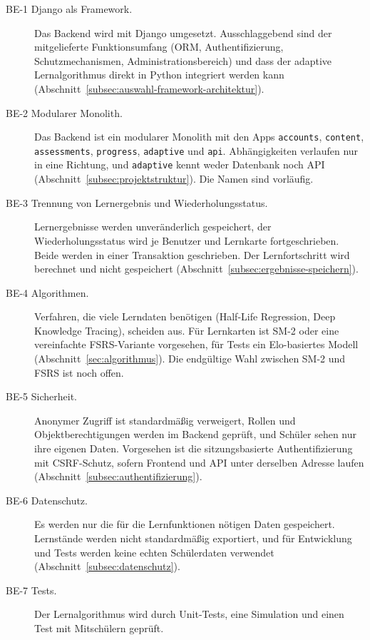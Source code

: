 \begin{description}
  \item[BE-1 Django als Framework.] Das Backend wird mit Django umgesetzt. Ausschlaggebend sind der mitgelieferte Funktionsumfang (ORM, Authentifizierung, Schutzmechanismen, Administrationsbereich) und dass der adaptive Lernalgorithmus direkt in Python integriert werden kann (Abschnitt~\ref{subsec:auswahl-framework-architektur}).
  \item[BE-2 Modularer Monolith.] Das Backend ist ein modularer Monolith mit den Apps \texttt{accounts}, \texttt{content}, \texttt{assessments}, \texttt{progress}, \texttt{adaptive} und \texttt{api}. Abhängigkeiten verlaufen nur in eine Richtung, und \texttt{adaptive} kennt weder Datenbank noch API (Abschnitt~\ref{subsec:projektstruktur}). Die Namen sind vorläufig.
  \item[BE-3 Trennung von Lernergebnis und Wiederholungsstatus.] Lernergebnisse werden unveränderlich gespeichert, der Wiederholungsstatus wird je Benutzer und Lernkarte fortgeschrieben. Beide werden in einer Transaktion geschrieben. Der Lernfortschritt wird berechnet und nicht gespeichert (Abschnitt~\ref{subsec:ergebnisse-speichern}).
  \item[BE-4 Algorithmen.] Verfahren, die viele Lerndaten benötigen (Half-Life Regression, Deep Knowledge Tracing), scheiden aus. Für Lernkarten ist SM-2 oder eine vereinfachte FSRS-Variante vorgesehen, für Tests ein Elo-basiertes Modell (Abschnitt~\ref{sec:algorithmus}). Die endgültige Wahl zwischen SM-2 und FSRS ist noch offen.
  \item[BE-5 Sicherheit.] Anonymer Zugriff ist standardmäßig verweigert, Rollen und Objektberechtigungen werden im Backend geprüft, und Schüler sehen nur ihre eigenen Daten. Vorgesehen ist die sitzungsbasierte Authentifizierung mit CSRF-Schutz, sofern Frontend und API unter derselben Adresse laufen (Abschnitt~\ref{subsec:authentifizierung}).
  \item[BE-6 Datenschutz.] Es werden nur die für die Lernfunktionen nötigen Daten gespeichert. Lernstände werden nicht standardmäßig exportiert, und für Entwicklung und Tests werden keine echten Schülerdaten verwendet (Abschnitt~\ref{subsec:datenschutz}).
  \item[BE-7 Tests.] Der Lernalgorithmus wird durch Unit-Tests, eine Simulation und einen Test mit Mitschülern geprüft.
\end{description}
 
